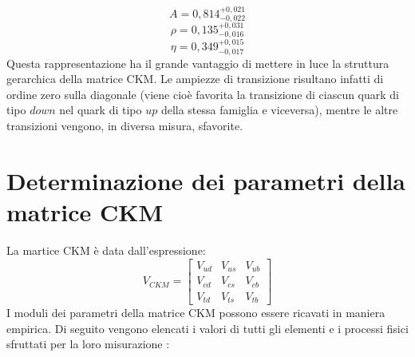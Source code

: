 \begin{equation}
A = 0,814^{+0,021}_{-0,022} 
\end{equation}
\begin{equation}
\rho = 0,135^{+0,031}_{-0,016} 
\end{equation}
\begin{equation}
\eta = 0,349^{+0,015}_{-0,017} 
\end{equation}
Questa rappresentazione ha il grande vantaggio di mettere in luce la struttura gerarchica della matrice CKM. Le ampiezze di transizione risultano infatti di ordine 
zero sulla diagonale (viene cioè favorita la transizione di ciascun quark di tipo $down$ nel quark di tipo $up$ della stessa famiglia e viceversa), mentre le altre 
transizioni vengono, in diversa misura, sfavorite.


\section{Determinazione dei parametri della matrice CKM}
\noindent
La martice CKM è data dall'espressione:
\begin{equation}
 V_{CKM} = \begin{bmatrix} V_{ud} & V_{us} & V_{ub} \\ V_{cd} & V_{cs} & V_{cb} \\ V_{td} & V_{ts} & V_{tb}\end{bmatrix}
\end{equation}
I moduli dei parametri della matrice CKM possono essere ricavati in maniera empirica. Di seguito vengono elencati i valori di tutti gli elementi e i processi fisici sfruttati
per la loro misurazione \cite{Sozzi}:
